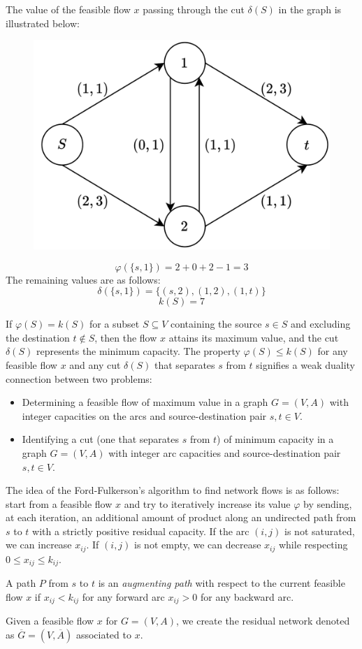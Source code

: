 \begin{example}
    The value of the feasible flow $x$ passing through the cut $\delta(S)$  in the graph is illustrated below:
    \begin{figure}[H]
        \centering
        \includegraphics[width=0.25\linewidth]{images/flow.png}
    \end{figure}
    \[\varphi(\{s,1\})=2+0+2-1=3\]
    The remaining values are as follows: 
    \[\delta(\{s,1\})=\{(s, 2),(1,2),(1, t)\}\]
    \[k(S)=7\]
\end{example}
If $\varphi(S) = k(S)$ for a subset $S \subseteq V$ containing the source $s \in S$ and excluding the destination $t \notin S$, then the flow $x$ attains its maximum value, and the cut $\delta(S)$ represents the minimum capacity. 
The property $\varphi(S) \leq k(S)$ for any feasible flow $x$ and any cut $\delta(S)$ that separates $s$ from $t$ signifies a weak duality connection between two problems:
\begin{itemize}
    \item Determining a feasible flow of maximum value in a graph $G = (V, A)$ with integer capacities on the arcs and source-destination pair $s, t \in V$.
    \item Identifying a cut (one that separates $s$ from $t$) of minimum capacity in a graph $G = (V, A)$ with integer arc capacities and source-destination pair $s, t \in V$.
\end{itemize} 
The idea of the Ford-Fulkerson's algorithm to find network flows is as follows: start from a feasible flow $x$ and try to iteratively increase its value $\varphi$ by sending, at each iteration, an additional amount of product along an undirected path from $s$ to $t$ with a strictly positive residual capacity. 
If the arc $(i,j)$ is not saturated, we can increase $x_{ij}$. 
If $(i,j)$ is not empty, we can decrease $x_{ij}$ while respecting $0 \leq x_{ij} \leq k_{ij}$. 
\begin{definition}
    A path $P$ from $s$ to $t$ is an \emph{augmenting path} with respect to the current feasible flow $x$ if $x_{ij} <  k_{ij}$ for any
    forward arc $x_{ij}>0$ for any backward arc. 
\end{definition}
Given a feasible flow $x$ for $G=(V,A)$, we create the residual network denoted as $\overline{G}=(V,\overline{A})$ associated to $x$. 

